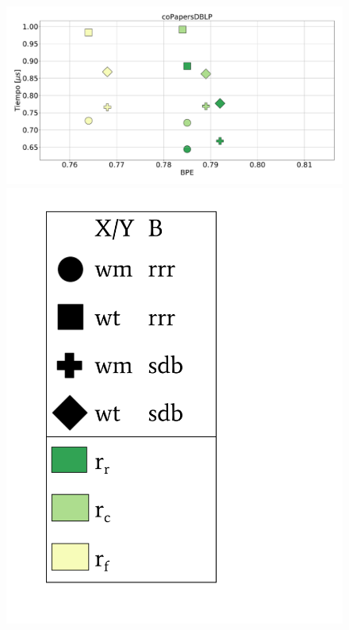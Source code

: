 \begin{figure}
    	\centering
    	\begin{minipage}{1\textwidth}
    			\centering
    			\begin{minipage}{0.8\textwidth}
    				\centering
    				\includegraphics[width=1\linewidth]{img/sdsl/secuencialBig/coPapersDBLP.pdf}
    			\end{minipage}
    			\begin{minipage}{0.15\textwidth}
    				\centering
    				\includegraphics[scale=.22, clip, trim=70 0 0 0]{img/sdsl/label.pdf}
    			\end{minipage}
    			

\end{minipage}
\end{figure}
